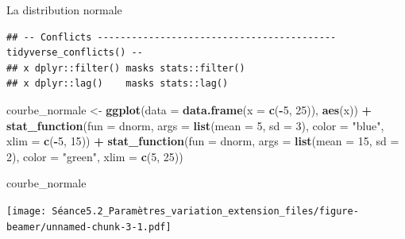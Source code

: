 \documentclass[ignorenonframetext,]{beamer}
\newenvironment{Shaded}{\begin{snugshade}}{\end{snugshade}}
\newcommand{\KeywordTok}[1]{\textcolor[rgb]{0.13,0.29,0.53}{\textbf{#1}}}
\newcommand{\DataTypeTok}[1]{\textcolor[rgb]{0.13,0.29,0.53}{#1}}
\newcommand{\DecValTok}[1]{\textcolor[rgb]{0.00,0.00,0.81}{#1}}
\newcommand{\StringTok}[1]{\textcolor[rgb]{0.31,0.60,0.02}{#1}}
\newcommand{\OperatorTok}[1]{\textcolor[rgb]{0.81,0.36,0.00}{\textbf{#1}}}
\newcommand{\NormalTok}[1]{#1}
\begin{document}
\begin{frame}[fragile]{La distribution normale}
\begin{verbatim}
## -- Conflicts ------------------------------------------ tidyverse_conflicts() --
## x dplyr::filter() masks stats::filter()
## x dplyr::lag()    masks stats::lag()
\end{verbatim}

\begin{Shaded}
\begin{Highlighting}[]
\NormalTok{courbe_normale <-}\StringTok{ }
\StringTok{  }\KeywordTok{ggplot}\NormalTok{(}\DataTypeTok{data =} \KeywordTok{data.frame}\NormalTok{(}\DataTypeTok{x =} \KeywordTok{c}\NormalTok{(}\OperatorTok{-}\DecValTok{5}\NormalTok{, }\DecValTok{25}\NormalTok{)), }\KeywordTok{aes}\NormalTok{(x)) }\OperatorTok{+}
\StringTok{  }\KeywordTok{stat_function}\NormalTok{(}\DataTypeTok{fun =}\NormalTok{ dnorm, }\DataTypeTok{args =} \KeywordTok{list}\NormalTok{(}\DataTypeTok{mean =} \DecValTok{5}\NormalTok{, }\DataTypeTok{sd =} \DecValTok{3}\NormalTok{), }\DataTypeTok{color =} \StringTok{"blue"}\NormalTok{,}
                \DataTypeTok{xlim =} \KeywordTok{c}\NormalTok{(}\OperatorTok{-}\DecValTok{5}\NormalTok{, }\DecValTok{15}\NormalTok{)) }\OperatorTok{+}
\StringTok{  }\KeywordTok{stat_function}\NormalTok{(}\DataTypeTok{fun =}\NormalTok{ dnorm, }\DataTypeTok{args =} \KeywordTok{list}\NormalTok{(}\DataTypeTok{mean =} \DecValTok{15}\NormalTok{, }\DataTypeTok{sd =} \DecValTok{2}\NormalTok{), }\DataTypeTok{color =} \StringTok{"green"}\NormalTok{,}
                \DataTypeTok{xlim =} \KeywordTok{c}\NormalTok{(}\DecValTok{5}\NormalTok{, }\DecValTok{25}\NormalTok{))}


\NormalTok{courbe_normale}
\end{Highlighting}
\end{Shaded}

\texttt{[image: Séance5.2\_Paramètres\_variation\_extension\_files/figure-beamer/unnamed-chunk-3-1.pdf]}

\end{frame}
\end{document}
